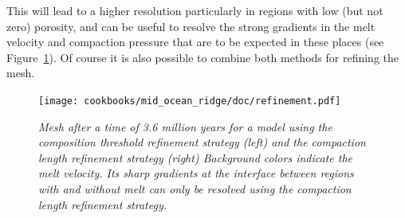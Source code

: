 \documentclass{article}
\begin{document}
This will lead to a higher resolution particularly in regions with low (but not zero) porosity,
and can be useful to resolve the strong gradients in the melt velocity and compaction pressure that
are to be expected in these places (see Figure~\ref{fig:mid-ocean-ridge-mesh}).
Of course it is also possible to combine both methods for refining the mesh.

\begin{figure}
    \centering
    \texttt{[image: cookbooks/mid\_ocean\_ridge/doc/refinement.pdf]}
    \caption{\it Mesh after a time of 3.6 million years for a model using the composition threshold
             refinement strategy (left) and the compaction length refinement strategy (right)
             Background colors indicate the melt velocity. Its sharp gradients at the interface
             between regions with and without melt can only be resolved using the compaction
             length refinement strategy.}
    \label{fig:mid-ocean-ridge-mesh}
\end{figure}
\end{document}
